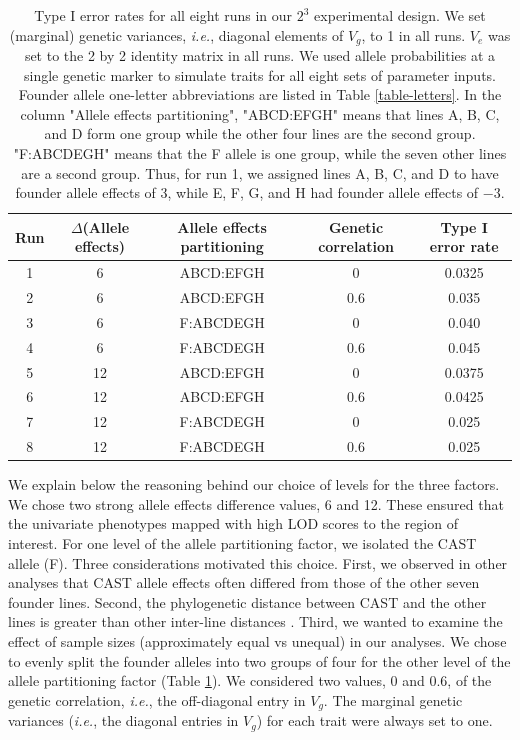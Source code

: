\documentclass[12pt,twoside, lineno]{gsajnl}
\begin{document}
\begin{center}
\begin{table}
\small
  \begin{tabular}{ c | c | c | c | c}
    \hline
    Run & $\Delta$(Allele effects) & Allele effects partitioning & Genetic correlation & Type I error rate \\ \hline
    1 & 6 & ABCD:EFGH & 0 & 0.0325\\
    2 & 6 & ABCD:EFGH & 0.6 & 0.035\\
    3 & 6 & F:ABCDEGH & 0 & 0.040\\
    4 & 6 & F:ABCDEGH & 0.6 & 0.045\\
    5 & 12 & ABCD:EFGH & 0 & 0.0375\\
    6 & 12 & ABCD:EFGH & 0.6 & 0.0425\\
    7 & 12 & F:ABCDEGH & 0 & 0.025\\
    8 & 12 & F:ABCDEGH & 0.6 & 0.025\\
    \hline
  \end{tabular}
  \caption{Type I error rates for all eight runs in our $2^3$
    experimental design. We set (marginal) genetic variances,
    \emph{i.e.}, diagonal elements of $V_g$, to 1 in all runs. $V_e$
    was set to the 2 by 2 identity matrix in all runs. We used allele
    probabilities at a single genetic marker to simulate traits for
    all eight sets of parameter inputs. Founder allele one-letter
    abbreviations are listed in Table \ref{table-letters}. In the
    column "Allele effects partitioning", "ABCD:EFGH" means that lines
    A, B, C, and D form one group while the other four lines are the
    second group. "F:ABCDEGH" means that the F allele is one group,
    while the seven other lines are a second group. Thus, for run 1,
    we assigned lines A, B, C, and D to have founder allele effects of
    $3$, while E, F, G, and H had founder allele effects of $-3$.}
  \label{table-typeI}
  \end{table}
\end{center}

We explain below the reasoning behind our choice of levels for the
three factors. We chose two strong allele effects difference values, 6
and 12. These ensured that the univariate phenotypes mapped with high
LOD scores to the region of interest. For one level of the allele
partitioning factor, we isolated the CAST allele (F). Three
considerations motivated this choice. First, we observed in other
analyses that CAST allele effects often differed from those of the
other seven founder lines. Second, the phylogenetic distance between
CAST and the other lines is greater than other inter-line distances
\citep{didion2013deconstructing}. Third, we wanted to examine the
effect of sample sizes (approximately equal vs unequal) in our
analyses. We chose to evenly split the founder alleles into two groups
of four for the other level of the allele partitioning factor (Table
\ref{table-typeI}). We considered two values, 0 and 0.6, of the
genetic correlation, \textit{i.e.}, the off-diagonal entry in $V_g$.
The marginal genetic variances (\textit{i.e.}, the diagonal entries in
$V_g$) for each trait were always set to one.
\end{document}
